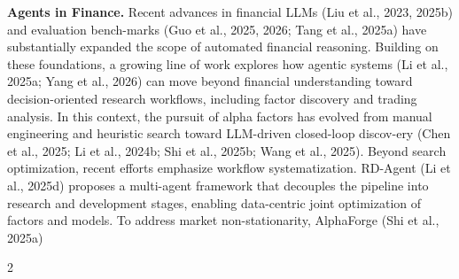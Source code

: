 \documentclass[
]{article}
\begin{document}
\textbf{Agents in Finance.} Recent advances in financial LLMs (Liu et
al., 2023, 2025b) and evaluation bench-marks (Guo et al., 2025, 2026;
Tang et al., 2025a) have substantially expanded the scope of automated
financial reasoning. Building on these foundations, a growing line of
work explores how agentic systems (Li et al., 2025a; Yang et al., 2026)
can move beyond financial understanding toward decision-oriented
research workflows, including factor discovery and trading analysis. In
this context, the pursuit of alpha factors has evolved from manual
engineering and heuristic search toward LLM-driven closed-loop
discov-ery (Chen et al., 2025; Li et al., 2024b; Shi et al., 2025b; Wang
et al., 2025). Beyond search optimization, recent efforts emphasize
workflow systematization. RD-Agent (Li et al., 2025d) proposes a
multi-agent framework that decouples the pipeline into research and
development stages, enabling data-centric joint optimization of factors
and models. To address market non-stationarity, AlphaForge (Shi et al.,
2025a)

2
\end{document}
